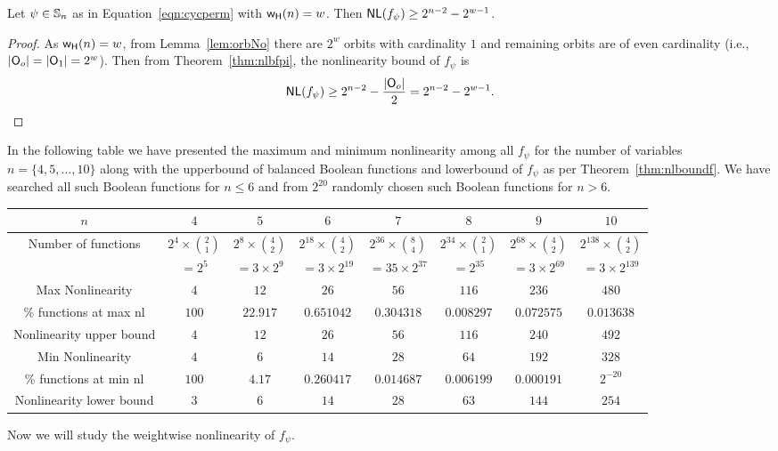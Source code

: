 \documentclass{llncs}
\begin{document}
\begin{theorem}\label{thm:nlboundf}
Let $\psi \in \mathbb{S}_n$ as in Equation~\ref{eqn:cycperm} with $\mathsf{w_H}(n) = w$.
Then $\mathsf{NL}(f_\psi) \ge 2^{n-2} - 2^{w-1}$.
\end{theorem}
\begin{proof}
As $\mathsf{w_H}(n) = w$, from Lemma~\ref{lem:orbNo} there are $2^w$ orbits with cardinality $1$ and remaining orbits are of even cardinality (i.e., $|\mathsf{O}_o| = |\mathsf{O}_1| = 2^w$).
Then from Theorem~\ref{thm:nlbfpi}, the nonlinearity bound of $f_\psi$ is
$$\mathsf{NL}(f_\psi) \ge 2^{n-2} - \frac{|\mathsf{O}_o|}{2} = 2^{n-2} - 2^{w-1}.$$
\end{proof}
In the following table we have presented the maximum and minimum nonlinearity among all $f_\psi$ for the number of variables $n = \{4, 5, \ldots, 10\}$ along with the upperbound of balanced Boolean functions and lowerbound of $f_{\psi}$ as per Theorem~\ref{thm:nlboundf}. We have searched all such Boolean functions for $n \leq 6$ and from $2^{20}$ randomly chosen such Boolean functions for $n > 6$.
\begin{center}
\begin{tabular}{|c|c|c|c||c|c|c|c|}\hline
$n$ & $4$ & $5$ & $6$ & $7$ & $8$ & $9$ & $10$\\ \hline
Number of functions & $2^4 \times \binom{2}{1}$ & $2^8 \times \binom{4}{2}$ & $2^{18} \times \binom{4}{2}$&$2^{36} \times \binom{8}{4}$&$2^{34} \times \binom{2}{1}$& $2^{68} \times \binom{4}{2}$& $2^{138} \times \binom{4}{2}$\\
& $ = 2^5$& $= 3\times 2^9$& $= 3\times 2^{19}$& $= 35\times 2^{37}$&$ = 2^{35}$&$= 3\times 2^{69}$& $= 3\times 2^{139}$\\ \hline
Max Nonlinearity & $4$ & $12$ & $26$ & $56$ & $116$ & $236$ & $480$\\ \hline
\% functions at max nl & $100$ & $22.917$ & $0.651042$ & $0.304318$ & $0.008297$ & $0.072575$ & $0.013638$\\ \hline
Nonlinearity upper bound & $4$ & $12$ & $26$ & $56$ & $116$ & $240$ & $492$\\ \hline
Min Nonlinearity & $4$ & $6$ & $14$ & $28$ & $64$ & $192$ & $328$\\ \hline
\% functions at min nl & $100$ & $4.17$ & $0.260417$ & $0.014687$ & $0.006199$ & $0.000191$ & $2^{-20}$\\ \hline
Nonlinearity lower bound & $3$ & $6$ & $14$ & $28$ & $63$ & $144$ & $254$\\ \hline
\end{tabular}
\end{center}
Now we will study the weightwise nonlinearity of $f_\psi$.
\end{document}

